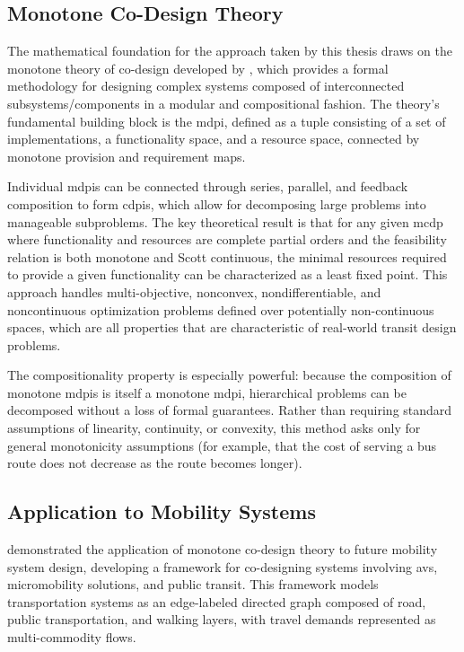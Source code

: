 \subsection{Monotone Co-Design Theory}

The mathematical foundation for the approach taken by this thesis draws on the monotone theory of co-design developed by \textcite{censi2016Mathematical}, which provides a formal methodology for designing complex systems composed of interconnected subsystems/components in a modular and compositional fashion. The theory's fundamental building block is the \gls{mdpi}, defined as a tuple consisting of a set of implementations, a functionality space, and a resource space, connected by monotone provision and requirement maps.

Individual \glspl{mdpi} can be connected through series, parallel, and feedback composition to form \glspl{cdpi}, which allow for decomposing large problems into manageable subproblems. The key theoretical result is that for any given \gls{mcdp} where functionality and resources are complete partial orders and the feasibility relation is both monotone and Scott continuous, the minimal resources required to provide a given functionality can be characterized as a least fixed point. This approach handles multi-objective, nonconvex, nondifferentiable, and noncontinuous optimization problems defined over potentially non-continuous spaces, which are all properties that are characteristic of real-world transit design problems.

The compositionality property is especially powerful: because the composition of monotone \glspl{mdpi} is itself a monotone \gls{mdpi}, hierarchical problems can be decomposed without a loss of formal guarantees. Rather than requiring standard assumptions of linearity, continuity, or convexity, this method asks only for general monotonicity assumptions (for example, that the cost of serving a bus route does not decrease as the route becomes longer).

\subsection{Application to Mobility Systems}

\textcite{zardiniCoDesignEnableUserFriendly2023} demonstrated the application of monotone co-design theory to future mobility system design, developing a framework for co-designing systems involving \glspl{av}, micromobility solutions, and public transit. This framework models transportation systems as an edge-labeled directed graph composed of road, public transportation, and walking layers, with travel demands represented as multi-commodity flows.

